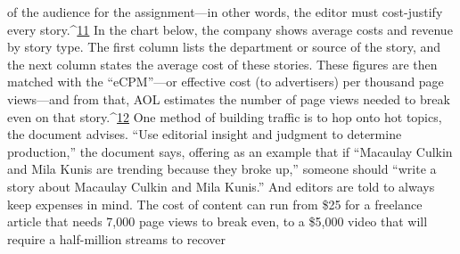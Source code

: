 of the audience for the assignment—in other words, the editor must cost-justify
every story.^{\href{#endnotes-chapter-9}{11}} In the chart below, the company shows average costs and revenue
by story type. The first column lists the department or source of the story, and
the next column states the average cost of these stories. These figures are then
matched with the ``eCPM''—or effective cost (to advertisers) per thousand page
views—and from that, AOL estimates the number of page views needed to break
even on that story.^{\href{#endnotes-chapter-9}{12}}
One method of building traffic is to hop onto hot topics, the document advises.
``Use editorial insight and judgment to determine production,'' the document
says, offering as an example that if ``Macaulay Culkin and Mila Kunis are trending
because they broke up,'' someone should ``write a story about Macaulay Culkin
and Mila Kunis.'' And editors are told to always keep expenses in mind. The cost
of content can run from \$25 for a freelance article that needs 7,000 page views
to break even, to a \$5,000 video that will require a half-million streams to recover

